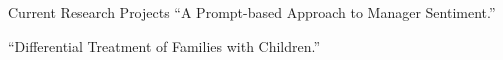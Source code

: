 \begin{rubric}{Current Research Projects}
\entry*[] ``A Prompt-based Approach to Manager Sentiment.''




\entry*[] ``Differential Treatment of Families with Children.''


\end{rubric}
